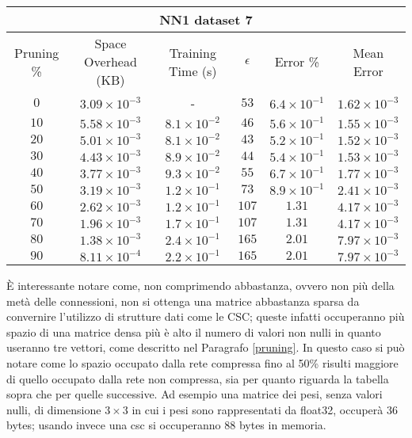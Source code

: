 \begin{adjustwidth}{0cm}{}
\begin{tabular}{cccccc}
\hline
\multicolumn{6}{c}{NN1 dataset 7} \\
\toprule
Pruning \% & Space Overhead (KB) & Training Time (s) & $\epsilon$ & Error \% & Mean Error\\
\midrule
$0$ & $3.09 \times 10^{-3}$ & - & $53$ & $6.4 \times 10^{-1}$ & $1.62 \times 10^{-3}$\\
$10$ & $5.58 \times 10^{-3}$ & $8.1 \times 10^{-2}$ & $46$ & $5.6 \times 10^{-1}$ & $1.55 \times 10^{-3}$\\
$20$ & $5.01 \times 10^{-3}$ & $8.1 \times 10^{-2}$ & $43$ & $5.2 \times 10^{-1}$ & $1.52 \times 10^{-3}$\\
$30$ & $4.43 \times 10^{-3}$ & $8.9 \times 10^{-2}$ & $44$ & $5.4 \times 10^{-1}$ & $1.53 \times 10^{-3}$\\
$40$ & $3.77 \times 10^{-3}$ & $9.3 \times 10^{-2}$ & $55$ & $6.7 \times 10^{-1}$ & $1.77 \times 10^{-3}$\\
$50$ & $3.19 \times 10^{-3}$ & $1.2 \times 10^{-1}$ & $73$ & $8.9 \times 10^{-1}$ & $2.41 \times 10^{-3}$\\
$60$ & $2.62 \times 10^{-3}$ & $1.2 \times 10^{-1}$ & $107$ & $1.31$ & $4.17 \times 10^{-3}$\\
$70$ & $1.96 \times 10^{-3}$ & $1.7 \times 10^{-1}$ & $107$ & $1.31$ & $4.17 \times 10^{-3}$\\
$80$ & $1.38 \times 10^{-3}$ & $2.4 \times 10^{-1}$ & $165$ & $2.01$ & $7.97 \times 10^{-3}$\\
$90$ & $8.11 \times 10^{-4}$ & $2.2 \times 10^{-1}$ & $165$ & $2.01$ & $7.97 \times 10^{-3}$\\
\bottomrule
\end{tabular}
\end{adjustwidth}

\par\null\par
\par\null\par
\par\null\par
È interessante notare come, non comprimendo abbastanza, ovvero non più della metà delle connessioni, non si ottenga una matrice abbastanza sparsa da convernire l'utilizzo di strutture dati come le CSC; queste infatti occuperanno più spazio di una matrice densa più è alto il numero di valori non nulli in quanto useranno tre vettori, come descritto nel Paragrafo \ref{pruning}.
In questo caso si può notare come lo spazio occupato dalla rete compressa fino al 50\% risulti maggiore di quello occupato dalla rete non compressa, sia per quanto riguarda la tabella sopra che per quelle successive.
Ad esempio una matrice dei pesi, senza valori nulli, di dimensione $3 \times 3$ in cui i pesi sono rappresentati da float32, occuperà 36 bytes; usando invece una csc si occuperanno 88 bytes in memoria.

